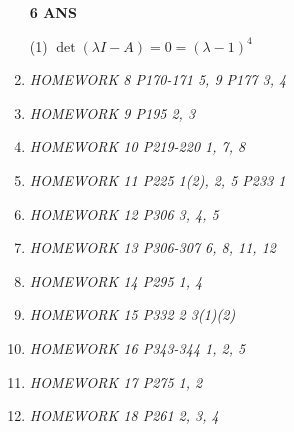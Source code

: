 \documentclass[11pt,letterpaper]{ctexart}
\begin{document}
\begin{enumerate}
\textbf{6 ANS}
\bigskip

(1) $\det(\lambda I - A) =  0 = (\lambda - 1)^4$



\item \textit{HOMEWORK 8 {P170-171 5, 9 P177 3, 4}}%

\item \textit{HOMEWORK 9 {P195 2, 3}}%


\item \textit{HOMEWORK 10 {P219-220 1, 7, 8}}%


\item \textit{HOMEWORK 11 {P225 1(2), 2, 5 P233 1}}%

\item \textit{HOMEWORK 12 {P306 3, 4, 5}}%

\item \textit{HOMEWORK 13 {P306-307 6, 8, 11, 12}}%

\item \textit{HOMEWORK 14 {P295 1, 4}}%


\item \textit{HOMEWORK 15 {P332 2 3(1)(2)}}%

\item \textit{HOMEWORK 16 {P343-344 1, 2, 5}}%


\item \textit{HOMEWORK 17 {P275 1, 2}}%

\item \textit{HOMEWORK 18 {P261 2, 3, 4}}%

\end{enumerate}
\end{document}
